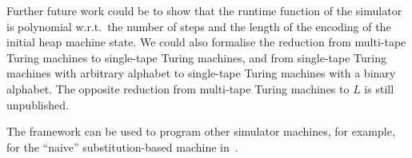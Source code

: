 Further future work could be to show that the runtime function of the simulator is polynomial w.r.t.\ the number of steps and the length of the
encoding of the initial heap machine state.  We could also formalise the reduction from multi-tape Turing machines to single-tape Turing machines, and
from single-tape Turing machines with arbitrary alphabet to single-tape Turing machines with a binary alphabet.  The opposite reduction from
multi-tape Turing machines to $L$ is still unpublished.

The framework can be used to program other simulator machines, for example, for the ``naive'' substitution-based machine
in~\cite{KunzeEtAl:2018:Formal}.


